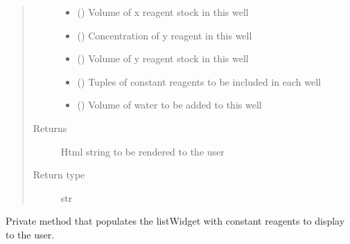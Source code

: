 \documentclass[letterpaper,10pt,english]{sphinxmanual}
\begin{document}
\begin{fulllineitems}
\begin{fulllineitems}
\begin{quote}
\begin{description}
\begin{itemize}
\item {} 
 ({\hyperref[\detokenize{polo.crystallography:polo.crystallography.cocktail.UnitValue}]{}}) \textendash{} Volume of x reagent stock in this well

\item {} 
 ({\hyperref[\detokenize{polo.crystallography:polo.crystallography.cocktail.UnitValue}]{}}) \textendash{} Concentration of y reagent in this well

\item {} 
 ({\hyperref[\detokenize{polo.crystallography:polo.crystallography.cocktail.UnitValue}]{}}) \textendash{} Volume of y reagent stock in this well

\item {} 
 () \textendash{} Tuples of constant reagents to be included in each well

\item {} 
 () \textendash{} Volume of water to be added to this well

\end{itemize}

\item[{Returns}] \leavevmode
Html string to be rendered to the user

\item[{Return type}] \leavevmode
str

\end{description}\end{quote}

\end{fulllineitems}


\begin{fulllineitems}
\label{\detokenize{polo.widgets:polo.widgets.optimize_widget.OptimizeWidget._set_constant_reagents}}
Private method that populates the listWidget with constant 
reagents to display to the user.


\end{fulllineitems}
\end{fulllineitems}
\end{document}

